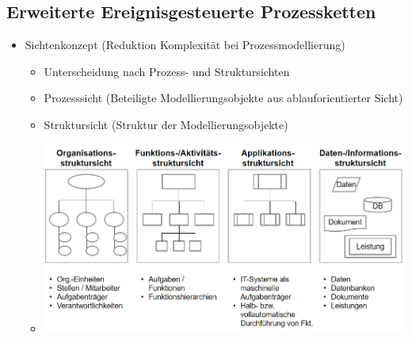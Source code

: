 \documentclass[11pt,a4paper]{article}
\begin{document}
\subsection{Erweiterte Ereignisgesteuerte Prozessketten}
\begin{itemize}
	\item Sichtenkonzept (Reduktion Komplexität bei Prozessmodellierung)
		\begin{itemize}
		\item Unterscheidung nach Prozess- und Struktursichten
		\item Prozesssicht (Beteiligte Modellierungsobjekte aus ablauforientierter Sicht)
		\item Struktursicht (Struktur der Modellierungsobjekte)
		\item[] \includegraphics[width=15cm]{Bilder/sichten}
		\end{itemize}
	

\end{itemize}
\end{document}
